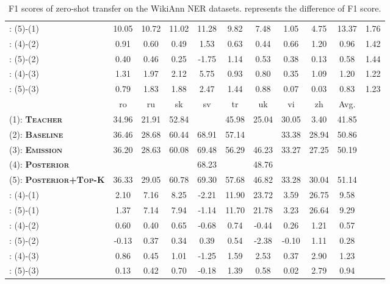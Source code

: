 \documentclass[11pt,a4paper]{article}
\begin{document}
\begin{table*}[t]
\begin{tabular}{l|cccccccccc}
: (5)-(1) & 10.05 & 10.72 & 11.02 & 11.28 & 9.82 & 7.48 & 1.05 & 4.75 & 13.37 & 1.76 \\
: (4)-(2) & 0.91 & 0.60 & 0.49 & 1.53 & 0.63 & 0.44 & 0.66 & 1.20 & 0.96 & 1.42 \\
: (5)-(2) & 0.40 & 0.46 & 0.25 & -1.75 & 1.14 & 0.53 & 0.38 & 0.13 & 0.58 & 1.44 \\
: (4)-(3) & 1.31 & 1.97 & 2.12 & 5.75 & 0.93 & 0.80 & 0.35 & 1.09 & 1.20 & 1.22 \\
: (5)-(3) & 0.79 & 1.83 & 1.88 & 2.47 & 1.44 & 0.88 & 0.07 & 0.03 & 0.83 & 1.23 \\
 \hline\hline
 & ro & ru & sk & sv & tr & uk & vi & zh & Avg. &  \\
 \hline
(1): {\bf\textsc{Teacher}}  & 34.96 & 21.91 & 52.84 &  & 45.98 & 25.04 & 30.05 & 3.40 & 41.85 &  \\
(2): {\bf\textsc{Baseline}}  & 36.46 & 28.68 & 60.44 & 68.91 & 57.14 &  & 33.38 & 28.94 & 50.86 &  \\
(3): {\bf\textsc{Emission}}  & 36.20 & 28.63 & 60.08 & 69.48 & 56.29 & 46.23 & 33.27 & 27.25 & 50.19 &  \\
(4): {\bf\textsc{Posterior}}  &  &  &  & 68.23 &  & 48.76 &  &  &  &  \\
(5): {\bf\textsc{Posterior+Top-K}}  & 36.33 & 29.05 & 60.78 & 69.30 & 57.68 & 46.82 & 33.28 & 30.04 & 51.14 &  \\
\hline
: (4)-(1) & 2.10 & 7.16 & 8.25 & -2.21 & 11.90 & 23.72 & 3.59 & 26.75 & 9.58 &  \\
: (5)-(1) & 1.37 & 7.14 & 7.94 & -1.14 & 11.70 & 21.78 & 3.23 & 26.64 & 9.29 &  \\
: (4)-(2) & 0.60 & 0.40 & 0.65 & -0.68 & 0.74 & -0.44 & 0.26 & 1.21 & 0.57 &  \\
: (5)-(2) & -0.13 & 0.37 & 0.34 & 0.39 & 0.54 & -2.38 & -0.10 & 1.11 & 0.28 &  \\
: (4)-(3) & 0.86 & 0.45 & 1.01 & -1.25 & 1.59 & 2.53 & 0.37 & 2.90 & 1.23 &  \\
: (5)-(3) & 0.13 & 0.42 & 0.70 & -0.18 & 1.39 & 0.58 & 0.02 & 2.79 & 0.94 & \\
\hline\hline
\end{tabular}
\caption{F1 scores of zero-shot transfer on the WikiAnn NER datasets.  represents the difference of F1 score.}
\label{tab:zs_ner}
\end{table*}
\end{document}
